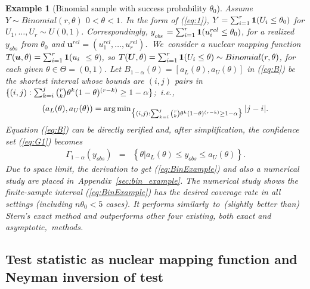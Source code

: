 \documentclass[12pt]{article}
\theoremstyle{shortspace}
\newtheorem{example}{\quad Example}
\def\*#1{\bm{#1}}
\begin{document}
\vspace{-2mm}
\begin{example}[Binomial sample with success probability $\theta_0$] \label{ex:bin}
Assume $Y \sim Binomial(r,\theta)$ $0 < \theta < 1$.  
In the form of  (\ref{eq:1}), $Y = \sum_{i =1}^r {\bf 1}{(U_i \leq \theta_0)}$ for $U_1, \ldots, U_r \sim U(0,1)$. Correspondingly, $y_{obs}$ $=  \sum_{i =1}^r {\bf 1}{(u_i^{rel} \leq \theta_0)}$, for a realized $y_{obs}$ from $\theta_0$ and $\*u^{rel} = (u_1^{rel} , \ldots, u_r^{rel} )$.~We~consider a nuclear mapping function
$T(\*u,  \theta) =  \sum_{i =1}^r {\bf 1}(u_i $ $\leq \theta)$, so $T(\*U,  \theta) =   \sum_{i =1}^r {\bf 1}{(U_i \leq \theta)} \sim Binomial(r, \theta)$, for each given $\theta \in \Theta = (0,1)$. Let $B_{1 -\alpha}(\theta) = [a_L(\theta)  , a_U(\theta)]$ in (\ref{eq:B}) be the shortest interval whose   
bounds are $(i,j)$ pairs in $\{(i,j): 
    \sum^j_{k=i} {r \atopwithdelims( ) k} \theta^k (1 - \theta)^{(r-k)} \geq 1 - \alpha\}$;~i.e.,  
\begin{equation}
    \label{eq:B-bounds}
\left(a_L(\theta), a_U(\theta)\right) = 
\arg\min\nolimits_{\big\{(i,j): \sum^j_{k=i} {r \atopwithdelims( ) k} \theta^k (1 -  \theta)^{(r-k)} \geq 1 - \alpha \big\}}
    |j-i|.
\end{equation} 
Equation (\ref{eq:B}) can be  directly verified  
and, after simplification, 
the confidence set (\ref{eq:G1}) becomes 
\begin{eqnarray}
\label{eq:BinExample}
\Gamma_{1-\alpha}(y_{obs}) &=& 
 \left\{ \theta \big |a_L(\theta) \leq y_{obs} \leq  a_U(\theta) \right\}.
\end{eqnarray}
Due to space limit, the derivation to get (\ref{eq:BinExample}) and also a numerical study are placed in~Appendix~\ref{sec:bin_example}. The numerical study shows the finite-sample interval 
(\ref{eq:BinExample}) has the desired coverage rate in all settings (including $n \theta_0 < 5$ cases). It performs similarly~to~(slightly~better than) Stern's exact method and outperforms other four existing, both exact and asymptotic,~methods. 
% 
\end{example}







\subsection{Test statistic as nuclear mapping function and Neyman inversion of test}\label{sec:NeymanInversion}
\end{document}
